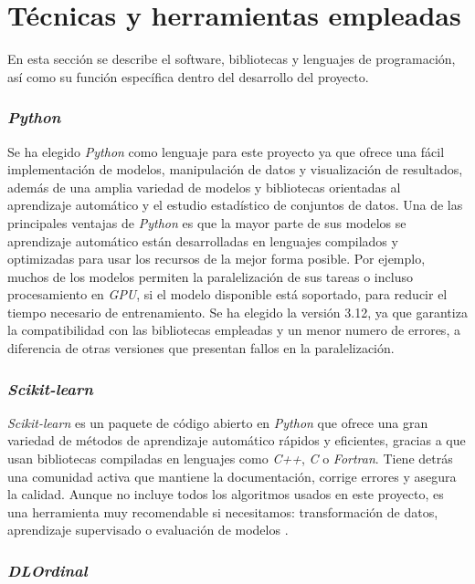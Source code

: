 \section{Técnicas y herramientas empleadas}
\label{sec:herramientas}

En esta sección se describe el software, bibliotecas y lenguajes de programación, así como su función específica dentro del desarrollo del proyecto.

\subsubsection{\textit{Python}}
\label{subsubsec:python}

Se ha elegido \textit{Python} como lenguaje para este proyecto ya que ofrece una fácil implementación de modelos, manipulación de datos y visualización de resultados, además de una amplia variedad de modelos y bibliotecas orientadas al aprendizaje automático y el estudio estadístico de conjuntos de datos. Una de las principales ventajas de \textit{Python} es que la mayor parte de sus modelos se aprendizaje automático están desarrolladas en lenguajes compilados y optimizadas para usar los recursos de la mejor forma posible. Por ejemplo, muchos de los modelos permiten la paralelización de sus tareas o incluso procesamiento en \textit{GPU}, si el modelo disponible está soportado, para reducir el tiempo necesario de entrenamiento. Se ha elegido la versión 3.12, ya que garantiza la compatibilidad con las bibliotecas empleadas y un menor numero de errores, a diferencia de otras versiones que presentan fallos en la paralelización.

\subsubsection{\textit{Scikit-learn}}
\label{subsubsec:sklearn}

\textit{Scikit-learn} es un paquete de código abierto en \textit{Python} que ofrece una gran variedad de métodos de aprendizaje automático rápidos y eficientes, gracias a que usan bibliotecas compiladas en lenguajes como \textit{C++}, \textit{C} o \textit{Fortran}. Tiene detrás una comunidad activa que mantiene la documentación, corrige errores y asegura la calidad. Aunque no incluye todos los algoritmos usados en este proyecto, es una herramienta muy recomendable si necesitamos: transformación de datos, aprendizaje supervisado o evaluación de modelos \cite{hao2019scikit}.

\subsubsection{\textit{DLOrdinal}}
\label{subsubsec:dlordinal}

